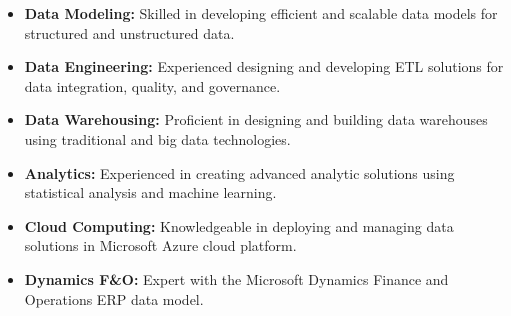 %
%
%

\medskip
\begin{itemize}
    \item \textbf{Data Modeling:} Skilled in developing efficient and scalable data models for structured and unstructured data.
    \item \textbf{Data Engineering:} Experienced designing and developing ETL solutions for data integration, quality, and  governance.
    \item \textbf{Data Warehousing:} Proficient in designing and building data warehouses using traditional and big data technologies.
    \item \textbf{Analytics:} Experienced in creating advanced analytic solutions using statistical analysis and machine learning.
    \item \textbf{Cloud Computing:} Knowledgeable in deploying and managing data solutions in Microsoft Azure cloud platform.
    \item \textbf{Dynamics F\&O:} Expert with the Microsoft Dynamics Finance and Operations ERP data model.
\end{itemize}
   
